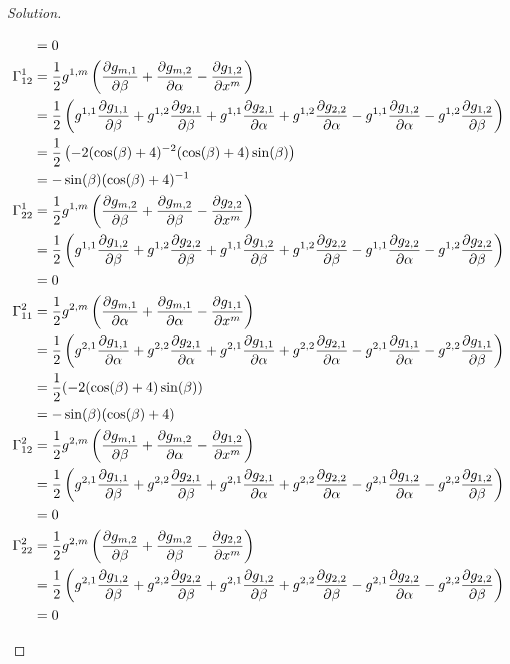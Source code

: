 \documentclass[a4paper]{article}
\begin{document}
\begin{proof}[Solution]
\begin{enumerate}[(a)]
\[\begin{aligned}
                      &= 0 \\
        \Gamma_{12}^1 &= \frac{1}{2} g^{1,m} \left( \pdv{g_{m,1}}{\beta} + \pdv{g_{m,2}}{\alpha} - \pdv{g_{1,2}}{x^m}\right) \\
                      &= \frac{1}{2} \left(g^{1,1} \pdv{g_{1,1}}{\beta} + g^{1,2}\pdv{g_{2,1}}{\beta} + g^{1,1} \pdv{g_{2,1}}{\alpha} + g^{1,2} \pdv{g_{2,2}}{\alpha} - g^{1,1}\pdv{g_{1,2}}{\alpha} - g^{1,2}\pdv{g_{1,2}}{\beta} \right) \\
                      &= \frac{1}{2} \left( -2(\cos(\beta) + 4)^{-2}(\cos(\beta) + 4)\sin(\beta) \right) \\
                      &= - \sin(\beta)(\cos(\beta) + 4)^{-1} \\
        \Gamma_{22}^1 &= \frac{1}{2} g^{1,m} \left( \pdv{g_{m,2}}{\beta} + \pdv{g_{m,2}}{\beta} - \pdv{g_{2,2}}{x^m} \right) \\
                      &= \frac{1}{2} \left( g^{1,1}\pdv{g_{1,2}}{\beta} + g^{1,2}\pdv{g_{2,2}}{\beta} + g^{1,1}\pdv{g_{1,2}}{\beta} + g^{1,2}\pdv{g_{2,2}}{\beta} - g^{1,1}\pdv{g_{2,2}}{\alpha} - g^{1,2}\pdv{g_{2,2}}{\beta} \right) \\
                      &= 0 \\
        \Gamma_{11}^2 &= \frac{1}{2} g^{2,m} \left( \pdv{g_{m,1}}{\alpha} + \pdv{g_{m,1}}{\alpha} - \pdv{g_{1,1}}{x^m}\right) \\
                      &=  \frac{1}{2} \left( g^{2,1} \pdv{g_{1,1}}{\alpha} + g^{2,2} \pdv{g_{2,1}}{\alpha} + g^{2,1}\pdv{g_{1,1}}{\alpha} + g^{2,2} \pdv{g_{2,1}}{\alpha} - g^{2,1}\pdv{g_{1,1}}{\alpha} - g^{2,2} \pdv{g_{1,1}}{\beta} \right) \\
                      &= \frac{1}{2}(-2(\cos(\beta)+4)\sin(\beta)) \\
                      &= -\sin(\beta)(\cos(\beta) + 4) \\
        \Gamma_{12}^2 &= \frac{1}{2} g^{2,m}\left(\pdv{g_{m,1}}{\beta} + \pdv{g_{m,2}}{\alpha} - \pdv{g_{1,2}}{x^m} \right) \\
                      &= \frac{1}{2} \left( g^{2,1}\pdv{g_{1,1}}{\beta} + g^{2,2}\pdv{g_{2,1}}{\beta} + g^{2,1} \pdv{g_{2,1}}{\alpha} + g^{2,2} \pdv{g_{2,2}}{\alpha} - g^{2,1} \pdv{g_{1,2}}{\alpha} - g^{2,2} \pdv{g_{1,2}}{\beta} \right) \\
                      &=  0 \\
      \Gamma_{22}^2 &= \frac{1}{2} g^{2,m} \left( \pdv{g_{m,2}}{\beta} + \pdv{g_{m,2}}{\beta} - \pdv{g_{2,2}}{x^m} \right) \\
                    &= \frac{1}{2} \left( g^{2,1} \pdv{g_{1,2}}{\beta} + g^{2,2}\pdv{g_{2,2}}{\beta} + g^{2,1} \pdv{g_{1,2}}{\beta} + g^{2,2} \pdv{g_{2,2}}{\beta} - g^{2,1} \pdv{g_{2,2}}{\alpha} - g^{2,2} \pdv{g_{2,2}}{\beta}  \right) \\
                    &=  0
        \end{aligned}
      \]
  \end{enumerate}
\end{proof}
\end{document}
